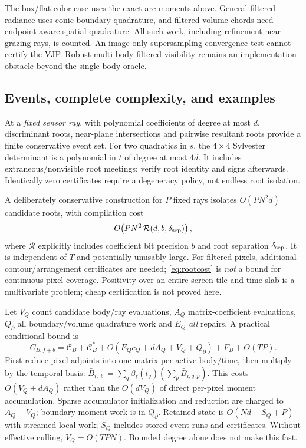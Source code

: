 \documentclass[10pt,letterpaper]{article}
\theoremstyle{remark}\newtheorem{counterexample}[proposition]{Counterexample}
\newcommand{\cost}{\mathcal C}
\begin{document}
The box/flat-color case uses the exact arc moments above. General filtered radiance uses conic boundary quadrature, and filtered volume chords need endpoint-aware spatial quadrature. All such work, including refinement near grazing rays, is counted. An image-only supersampling convergence test cannot certify the VJP. Robust multi-body filtered visibility remains an implementation obstacle beyond the single-body oracle.

\subsection{Events, complete complexity, and examples}
At a \emph{fixed sensor ray}, with polynomial coefficients of degree at most $d$, discriminant roots, near-plane intersections and pairwise resultant roots provide a finite conservative event set. For two quadratics in $s$, the $4\times4$ Sylvester determinant is a polynomial in $t$ of degree at most $4d$. It includes extraneous/nonvisible root meetings; verify root identity and signs afterwards. Identically zero certificates require a degeneracy policy, not endless root isolation.

A deliberately conservative construction for $P$ fixed rays isolates $O(PN^2d)$ candidate roots, with compilation cost
\begin{equation}
 O\!\left(PN^2\,\mathcal R(d,b,\delta_{\rm sep})\right), \label{eq:rootcost}
\end{equation}
where $\mathcal R$ explicitly includes coefficient bit precision $b$ and root separation $\delta_{\rm sep}$. It is independent of $T$ and potentially unusably large. For filtered pixels, additional contour/arrangement certificates are needed; \eqref{eq:rootcost} is \emph{not} a bound for continuous pixel coverage. Positivity over an entire screen tile and time slab is a multivariate problem; cheap certification is not proved here.

Let $V_Q$ count candidate body/ray evaluations, $A_Q$ matrix-coefficient evaluations, $Q_\partial$ all boundary/volume quadrature work and $E_Q$ \emph{all} repairs. A practical conditional bound is
\begin{equation}
 C_{B,f+b}=\cost_B+\cost_B^*+O(E_Qc_Q+dA_Q+V_Q+Q_\partial)+F_B+\Theta(TP).
 \label{eq:costB}
\end{equation}
First reduce pixel adjoints into one matrix per active body/time, then multiply by the temporal basis: $\bar B_{i,\ell}=\sum_q\beta_\ell(t_q)(\sum_p\bar B_{i,q,p})$. This costs $O(V_Q+dA_Q)$ rather than the $O(dV_Q)$ of direct per-pixel moment accumulation. Sparse accumulator initialization and reduction are charged to $A_Q+V_Q$; boundary-moment work is in $Q_\partial$. Retained state is $O(Nd+S_Q+P)$ with streamed local work; $S_Q$ includes stored event runs and certificates. Without effective culling, $V_Q=\Theta(TPN)$. Bounded degree alone does not make this fast.
\end{document}
